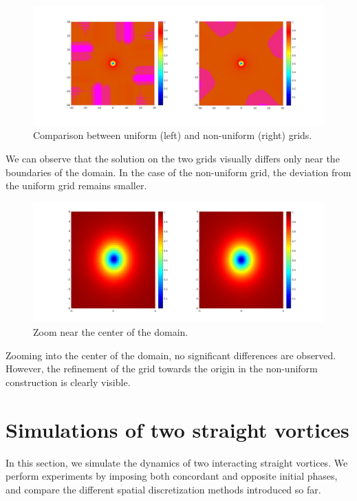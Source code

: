 \begin{figure}[H]
    \centering
    \includegraphics[width=\textwidth]{img/comparison_unfd.pdf}
    \caption{Comparison between uniform (left) and non-uniform (right) grids.}
\end{figure}

We can observe that the solution on the two grids visually differs only near the boundaries of the domain. In the case of the non-uniform grid, the deviation from the uniform grid remains smaller.

\begin{figure}[H]
    \centering
    \includegraphics[width=\textwidth]{img/comparison_unfd_5.pdf}
    \caption{Zoom near the center of the domain.}
\end{figure}

Zooming into the center of the domain, no significant differences are observed. However, the refinement of the grid towards the origin in the non-uniform construction is clearly visible.

\section{Simulations of two straight vortices}

In this section, we simulate the dynamics of two interacting straight vortices. We perform experiments by imposing both concordant and opposite initial phases, and compare the different spatial discretization methods introduced so far.

